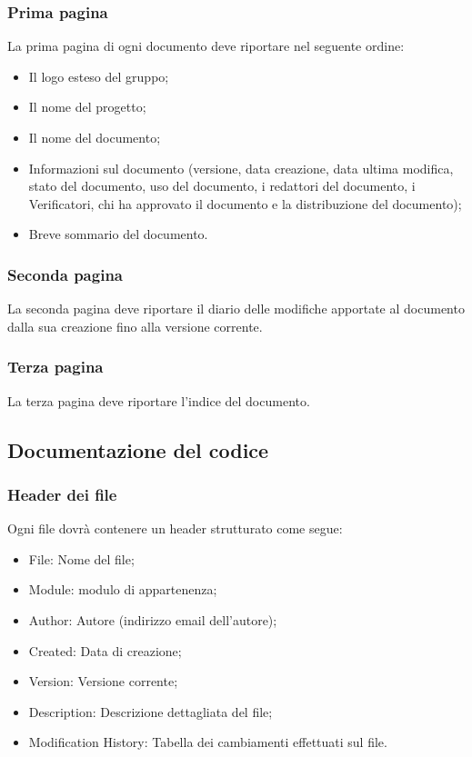 \subsubsection{Prima pagina}
\label{5.2.3}
La prima pagina di ogni documento deve riportare nel seguente ordine:
\begin{itemize}
\item Il logo esteso del gruppo;
\item Il nome del progetto;
\item Il nome del documento;
\item Informazioni sul documento (versione, data creazione, data ultima modifica, stato del documento, uso del documento, i redattori del documento, i Verificatori, chi ha approvato il documento e la distribuzione del documento);
\item Breve sommario del documento.
\end{itemize}

\subsubsection{Seconda pagina}
\label{5.2.4}
La seconda pagina deve riportare il diario delle modifiche apportate al documento dalla sua creazione fino alla versione corrente.

\subsubsection{Terza pagina}
\label{5.2.5}
La terza pagina deve riportare l'indice del documento.

\subsection{Documentazione del codice}
\label{5.3}

\subsubsection{Header dei file}
\label{5.3.1}
Ogni file dovrà contenere un header strutturato come segue:
\begin{itemize}
\item File: Nome del file;
\item Module: modulo di appartenenza;
\item Author: Autore (indirizzo email dell'autore);
\item Created: Data di creazione;
\item Version: Versione corrente;
\item Description: Descrizione dettagliata del file;
\item Modification History: Tabella dei cambiamenti effettuati sul file.
\end{itemize}

